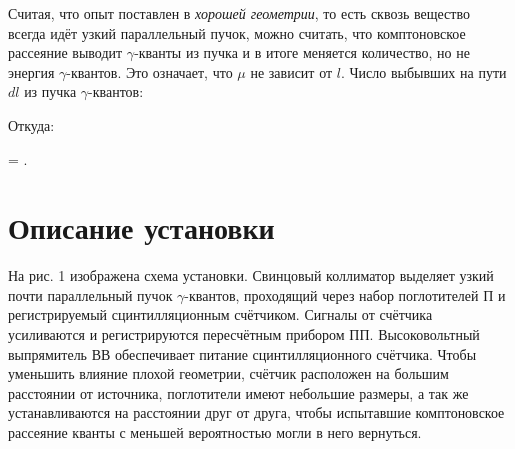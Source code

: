 Считая, что опыт поставлен в \textit{хорошей геометрии}, то есть сквозь вещество всегда
идёт узкий параллельный пучок, можно считать, что комптоновское рассеяние выводит
$ \gamma $-кванты из пучка и в итоге меняется количество, но не энергия $ \gamma $-квантов.
Это означает, что $ \mu $ не зависит от $ l $. Число выбывших на пути $ dl $ из пучка
$ \gamma $-квантов: \\


Откуда: \\


 {
    \mu =  \ln {}.
}

\section{Описание установки}


На рис. 1 изображена схема установки. Свинцовый коллиматор выделяет узкий почти параллельный
пучок $ \gamma $-квантов, проходящий через набор поглотителей П и регистрируемый сцинтилляционным
счётчиком. Сигналы от счётчика усиливаются и регистрируются пересчётным прибором ПП.
Высоковольтный выпрямитель ВВ обеспечивает питание сцинтилляционного счётчика. Чтобы
уменьшить влияние плохой геометрии, счётчик расположен на большим расстоянии от источника,
поглотители имеют небольшие размеры, а так же устанавливаются на расстоянии друг от друга,
чтобы испытавшие комптоновское рассеяние кванты с меньшей вероятностью могли в него вернуться.

